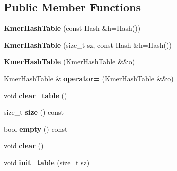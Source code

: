 \subsection*{Public Member Functions}
\begin{DoxyCompactItemize}
\item 
\mbox{\label{structKmerHashTable_a4fd5671e21ccf41796ba0e7eec952123}} 
{\bfseries Kmer\+Hash\+Table} (const Hash \&h=Hash())
\item 
\mbox{\label{structKmerHashTable_a49411707da7d8f5fc3b9ce266399caa1}} 
{\bfseries Kmer\+Hash\+Table} (size\+\_\+t sz, const Hash \&h=Hash())
\item 
\mbox{\label{structKmerHashTable_ab15081d048bbd3061a2807b64883fbbc}} 
{\bfseries Kmer\+Hash\+Table} (\hyperlink{structKmerHashTable}{Kmer\+Hash\+Table} \&\&o)
\item 
\mbox{\label{structKmerHashTable_aa2df751c3f539c4398dd7f414b5019f6}} 
\hyperlink{structKmerHashTable}{Kmer\+Hash\+Table} \& {\bfseries operator=} (\hyperlink{structKmerHashTable}{Kmer\+Hash\+Table} \&\&o)
\item 
\mbox{\label{structKmerHashTable_a566f787df4695cd0c0e9a5501ef77c00}} 
void {\bfseries clear\+\_\+table} ()
\item 
\mbox{\label{structKmerHashTable_a1f8ec7004b342c5ae10ae50cf7fd5b63}} 
size\+\_\+t {\bfseries size} () const
\item 
\mbox{\label{structKmerHashTable_ac5ced526b2b611e58b7b17a4120e6d24}} 
bool {\bfseries empty} () const
\item 
\mbox{\label{structKmerHashTable_af073147669cfe7f5a0638c2650374ea6}} 
void {\bfseries clear} ()
\item 
\mbox{\label{structKmerHashTable_a49870bd85d000dd8642a292960980c70}} 
void {\bfseries init\+\_\+table} (size\+\_\+t sz)
\item 
\mbox{\label{structKmerHashTable_a4b01e75faeca6c79c558fc37ec9a3fa1}} 

\end{DoxyCompactItemize}
